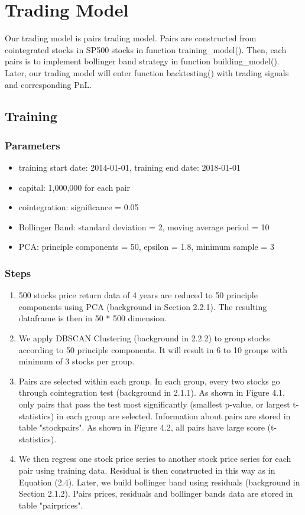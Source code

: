 \chapter{Trading Model}
\label{chap:trading model}

Our trading model is pairs trading model. Pairs are constructed from cointegrated stocks in SP500 stocks in function training\_model(). Then, each pairs is to implement bollinger band strategy in function building\_model(). Later, our trading model will enter function backtesting() with trading signals and corresponding PnL.

\section{Training}

\subsection{Parameters}
\begin{itemize}
    \item training start date: 2014-01-01, training end date: 2018-01-01
    \item capital: 1,000,000 for each pair
    \item cointegration: significance = 0.05
    \item Bollinger Band: standard deviation = 2, moving average period = 10
    \item PCA: principle components = 50, epsilon = 1.8, minimum sample = 3
\end{itemize}

\subsection{Steps}
\begin{enumerate}
    \item 500 stocks price return data of 4 years are reduced to 50 principle components using PCA (background in Section 2.2.1). The resulting dataframe is then in 50 * 500 dimension.
    \item We apply DBSCAN Clustering (background in 2.2.2) to group stocks according to 50 principle components. It will result in 6 to 10 groups with minimum of 3 stocks per group.
    \item Pairs are selected within each group. In each group, every two stocks go through cointegration test (background in 2.1.1). As shown in Figure 4.1, only pairs that pass the test most significantly (smallest p-value, or largest t-statistics) in each group are selected. Information about pairs are stored in table "stockpairs". As shown in Figure 4.2, all pairs have large score (t-statistics).
    \item We then regress one stock price series to another stock price series for each pair using training data. Residual is then constructed in this way as in Equation (2.4). Later, we build bollinger band using residuals (background in Section 2.1.2). Pairs prices, residuals and bollinger bands data are stored in table "pairprices". 
\end{enumerate}

